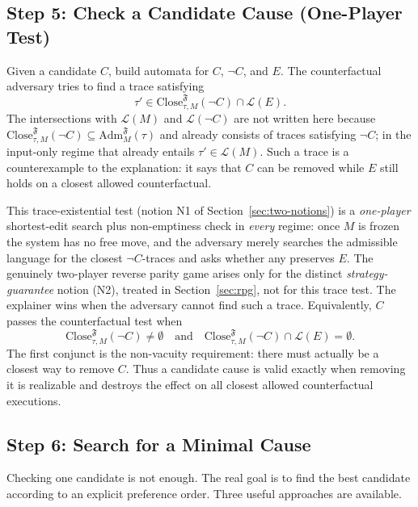 \documentclass[11pt]{article}
\theoremstyle{remark}
\newcommand{\Close}{\mathrm{Close}}
\newcommand{\Lang}{\mathcal{L}}
\newcommand{\Frame}{\mathfrak{F}}
\newcommand{\Adm}{\mathrm{Adm}}
\begin{document}
\subsection{Step 5: Check a Candidate Cause (One-Player Test)}
\label{step:check}

Given a candidate \(C\), build automata for \(C\), \(\neg C\), and \(E\). The
counterfactual adversary tries to find a trace satisfying
\[
  \tau'
  \in
  \Close_{\tau,M}^{\Frame}(\neg C)
  \cap
  \Lang(E).
\]
The intersections with \(\Lang(M)\) and \(\Lang(\neg C)\) are not written here
because \(\Close_{\tau,M}^{\Frame}(\neg C)\subseteq\Adm_M^{\Frame}(\tau)\) and
already consists of traces satisfying \(\neg C\); in the input-only regime that
already entails \(\tau'\in\Lang(M)\). Such a trace is a counterexample to the
explanation: it says that \(C\) can be removed while \(E\) still holds on a
closest allowed counterfactual.

This trace-existential test (notion N1 of Section~\ref{sec:two-notions}) is a
\emph{one-player} shortest-edit search plus non-emptiness check in \emph{every}
regime: once \(M\) is
frozen the system has no free move, and the adversary merely searches the
admissible language for the closest \(\neg C\)-traces and asks whether any
preserves \(E\). The genuinely
two-player reverse parity game arises only for the distinct
\emph{strategy-guarantee} notion (N2), treated in Section~\ref{sec:rpg}, not for
this trace test. The explainer wins when the adversary cannot find such a trace. Equivalently, \(C\) passes the
counterfactual test when
\[
  \Close_{\tau,M}^{\Frame}(\neg C) \neq \emptyset
  \quad\text{and}\quad
  \Close_{\tau,M}^{\Frame}(\neg C) \cap \Lang(E) = \emptyset .
\]
The first conjunct is the non-vacuity requirement: there must actually be a
closest way to remove \(C\). Thus a candidate cause is valid exactly when
removing it is realizable and destroys the effect on all closest allowed
counterfactual executions.

\subsection{Step 6: Search for a Minimal Cause}
\label{step:search}

Checking one candidate is not enough. The real goal is to find the best
candidate according to an explicit preference order. Three useful approaches
are available.
\end{document}

